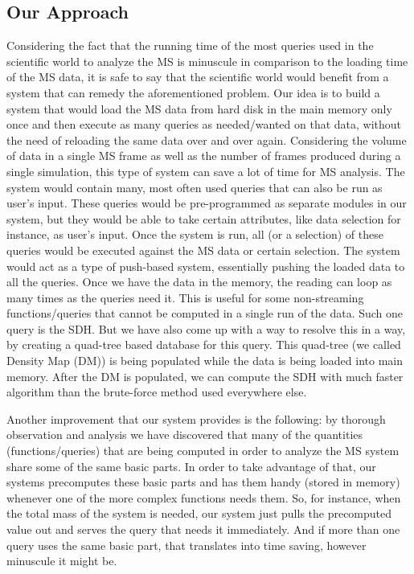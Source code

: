 \documentclass[10pt,journal,final,letterpaper,twocolumn]{IEEEtran}
\begin{document}
\subsection{Our Approach}
Considering the fact that the running time of the most queries used
in the scientific world to analyze the MS is minuscule in comparison
to the loading time of the MS data, it is safe to say that the
scientific world would benefit from a system that can remedy the
aforementioned problem. Our idea is to build a system that would
load the MS data from hard disk in the main memory only once and
then execute as many queries as needed/wanted on that data, without
the need of reloading the same data over and over again. Considering
the volume of data in a single MS frame as well as the number of
frames produced during a single simulation, this type of system can
save a lot of time for MS analysis. The system would contain many,
most often used queries that can also be run as user's input. These
queries would be pre-programmed as separate modules in our system,
but they would be able to take certain attributes, like data
selection for instance, as user's input. Once the system is run, all
(or a selection) of these queries would be executed against the MS
data or certain selection. The system would act as a type of
push-based system, essentially pushing the loaded data to all the
queries. Once we have the data in the memory, the reading can loop
as many times as the queries need it. This is useful for some
non-streaming functions/queries that cannot be computed in a single
run of the data. Such one query is the SDH. But we have also come up
with a way to resolve this in a way, by creating a quad-tree based
database for this query. This quad-tree (we called Density Map (DM))
is being populated while the data is being loaded into main memory.
After the DM is populated, we can compute the SDH with much faster
algorithm than the brute-force method used everywhere else.

Another improvement that our system provides is the following: by
thorough observation and analysis we have discovered that many of
the quantities (functions/queries) that are being computed in order
to analyze the MS system share some of the same basic parts. In
order to take advantage of that, our systems precomputes these basic
parts and has them handy (stored in memory) whenever one of the more
complex functions needs them. So, for instance, when the total mass
of the system is needed, our system just pulls the precomputed value
out and serves the query that needs it immediately. And if more than
one query uses the same basic part, that translates into time
saving, however minuscule it might be.
\end{document}

